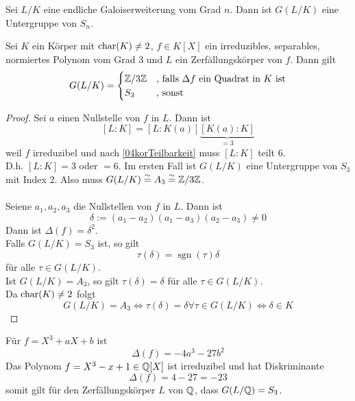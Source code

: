 	\begin{kor}\label{04korTeilbarkeit}
		Sei $L/K$ eine endliche Galoiserweiterung vom Grad $n$. Dann ist $G(L/K)$ eine Untergruppe von $S_n$.
	\end{kor}

	\begin{exm}
		Sei $K$ ein Körper mit $\operatorname{char}(K)\neq 2$, $f\in K[X]$ ein irreduzibles, separables, normiertes Polynom vom Grad $3$ und $L$ ein Zerfällungskörper von $f$. Dann gilt
		\[G(L/K)=\begin{cases}
		\mathbb{Z}/3\mathbb{Z}&\text{, falls $\Delta f$ ein Quadrat in $K$ ist}\\
		S_3&\text{, sonst}
		\end{cases}\]
	\end{exm}
	\begin{proof}
		Sei $a$ einen Nullstelle von $f$ in $L$. Dann ist
		\[[L:K]=[L:K(a)]\underbrace{[K(a):K]}_{=3}\]
		weil $f$ irreduzibel und nach \ref{04korTeilbarkeit} muss $[L:K]$ teilt $6$.\\
		D.h. $[L:K]=3$ oder $=6$. Im ersten Fall ist $G(L/K)$ eine Untergruppe von $S_3$ mit Index $2$. Also muss $G(L/K)\overset{\sim}{=} A_3\overset{\sim}{=}\mathbb{Z}/3\mathbb{Z}$.\\
		\\
		Seiene $a_1,a_2,a_3$ die Nullstellen von $f$ in $L$. Dann ist
		\[\delta:=(a_1-a_2)(a_1-a_3)(a_2-a_3)\neq 0\]
		Dann ist $\Delta(f)=\delta^2$.\\
		Falls $G(L/K)=S_3$ ist, so gilt
		\[\tau(\delta)=\operatorname{sgn}(\tau)\delta\]
		für alle $\tau\in G(L/K)$.\\
		Ist $G(L/K)=A_3$, so gilt $\tau(\delta)=\delta$ für alle $\tau\in G(L/K)$.\\
		Da $\operatorname{char}(K)\neq 2$ folgt
		\[G(L/K)=A_3\Leftrightarrow\tau(\delta)=\delta\forall\tau\in G(L/K)\Leftrightarrow\delta\in K\]
	\end{proof}

	\begin{exm}
		Für $f=X^3+aX+b$ ist
		\[\Delta(f)=-4a^3-27b^2\]
		Das Polynom $f=X^3-x+1\in\mathbb{Q}[X]$ ist irreduzibel und hat Diskriminante 
		\[\Delta(f)=4-27=-23\]
		somit gilt für den Zerfällungskörper $L$ von $\mathbb{Q}$, dass $G(L/\mathbb{Q})=S_3$.
	\end{exm}

